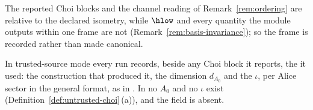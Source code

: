 
The reported Choi blocks and the channel reading of
Remark~\ref{rem:ordering} are relative to the declared isometry, while
$\hlow$ and every quantity the module outputs within one frame are not
(Remark~\ref{rem:basis-invariance}); so the frame is recorded rather than
made canonical.

\begin{requirement}\label{req:frame-recorded}
In trusted-source mode every run records, beside any Choi block it
reports, the  it used: the construction that produced
it, the dimension $d_{A_0}$ and the  $\iota$, per
Alice sector in the general format, as  in
. In  no $A_0$ and no
$\iota$ exist (Definition~\ref{def:untrusted-choi}\,(a)), and the field is
absent.
\end{requirement}
